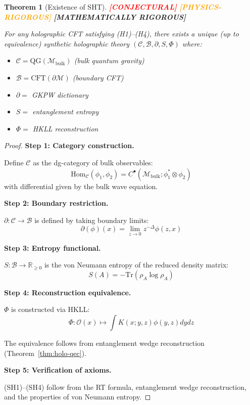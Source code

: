 \documentclass[12pt,a4paper]{article}
\newtheorem{theorem}{Theorem}[section]
\newcommand{\rigormark}[1]{%
  \ifcase#1
    \textcolor{red}{\textbf{[CONJECTURAL]}}%
  \or
    \textcolor{orange}{\textbf{[PHYSICS-RIGOROUS]}}%
  \or
    \textcolor{green!50!black}{\textbf{[MATHEMATICALLY RIGOROUS]}}%
  \fi
}
\begin{document}
\begin{theorem}[Existence of SHT]\label{thm:sht-existence}
\rigormark{2}

For any holographic CFT satisfying (H1)--(H4), there exists a unique (up to equivalence) synthetic holographic theory $(\mathcal{C}, \mathcal{B}, \partial, S, \Phi)$ where:
\begin{itemize}
    \item $\mathcal{C} = \text{QG}(\mathcal{M}_{\text{bulk}})$ (bulk quantum gravity)
    \item $\mathcal{B} = \text{CFT}(\partial\mathcal{M})$ (boundary CFT)
    \item $\partial = $ GKPW dictionary
    \item $S = $ entanglement entropy
    \item $\Phi = $ HKLL reconstruction
\end{itemize}
\end{theorem}

\begin{proof}
\textbf{Step 1: Category construction.}

Define $\mathcal{C}$ as the dg-category of bulk observables:
\begin{equation}
\text{Hom}_{\mathcal{C}}(\phi_1, \phi_2) = C^\bullet(\mathcal{M}_{\text{bulk}}; \phi_1^* \otimes \phi_2)
\end{equation}
with differential given by the bulk wave equation.

\textbf{Step 2: Boundary restriction.}

$\partial: \mathcal{C} \to \mathcal{B}$ is defined by taking boundary limits:
\begin{equation}
\partial(\phi)(x) = \lim_{z \to 0} z^{-\Delta} \phi(z, x)
\end{equation}

\textbf{Step 3: Entropy functional.}

$S: \mathcal{B} \to \mathbb{R}_{\geq 0}$ is the von Neumann entropy of the reduced density matrix:
\begin{equation}
S(A) = -\text{Tr}(\rho_A \log \rho_A)
\end{equation}

\textbf{Step 4: Reconstruction equivalence.}

$\Phi$ is constructed via HKLL:
\begin{equation}
\Phi: \mathcal{O}(x) \mapsto \int K(x; y, z) \phi(y, z) dy dz
\end{equation}

The equivalence follows from entanglement wedge reconstruction (Theorem~\ref{thm:holo-qec}).

\textbf{Step 5: Verification of axioms.}

(SH1)--(SH4) follow from the RT formula, entanglement wedge reconstruction, and the properties of von Neumann entropy.
\end{proof}
\end{document}
